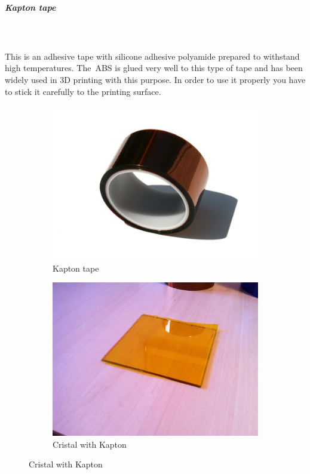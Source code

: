 \documentclass[11pt,a4paper]{article}
\begin{document}
				\subparagraph{Kapton tape}\mbox{}\\\\
This is an adhesive tape with silicone adhesive polyamide prepared to withstand high temperatures. The ABS is glued very well to this type of tape and has been widely used in 3D printing with this purpose. In order to use it properly you have to stick it carefully to the printing surface.
\begin{figure}[H]
    \centering
    \begin{subfigure}[b]{0.4\textwidth}
        \includegraphics[width=\textwidth,cfbox=azul_marcos 4pt 0pt]{FOTOS/KAPTON1}
	\caption*{Kapton tape}
    \end{subfigure}
    \qquad %
    \begin{subfigure}[b]{0.4\textwidth}
        \includegraphics[width=\textwidth,cfbox=azul_marcos 4pt 0pt]{FOTOS/KAPTON2}
	\caption*{Cristal with Kapton}
    \end{subfigure}   
\end{figure}
\end{document}
